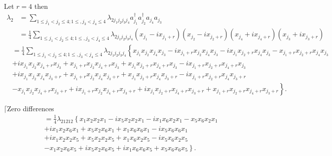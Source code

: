 \documentclass[aps, preprint]{revtex4}
\begin{document}
Let $r =4$ then
\begin{align*}\lambda _{2} &  =\sum _{1 \leq j_{1} <j_{2} \leq 4 ;1 \leq  ,j_{3} <j_{4} \leq 4}\lambda _{2 j_{1} j_{2} j_{3} j_{4}} a_{j_{1}}^{ \dag } a_{j_{2}}^{ \dag } a_{j_{4}} a_{j_{3}} \\
 &  =\frac{1}{4} \sum _{1 \leq j_{1} <j_{2} \leq 4 ;1 \leq  ,j_{3} <j_{4} \leq 4}\lambda _{2 j_{1} j_{2} j_{3} j_{4}} \left (x_{j_{1}} -i x_{j_{1} +r}\right ) \left (x_{j_{2}} -i x_{j_{2} +r}\right ) \left (x_{j_{4}} +i x_{j_{4} +r}\right ) \left (x_{j_{3}} +i x_{j_{3} +r}\right )\end{align*}
\begin{align} &  =\frac{1}{4} \sum _{1 \leq j_{1} <j_{2} \leq 4 ;1 \leq  ,j_{3} <j_{4} \leq 4}\lambda _{2 j_{1} j_{2} j_{3} j_{4}}\left \{x_{j_{1}} x_{j_{2}} x_{j_{4}} x_{j_{3}} -i x_{j_{1} +r} x_{j_{2}} x_{j_{4}} x_{j_{3}} -i x_{j_{1}} x_{j_{2} +r} x_{j_{4}} x_{j_{3}} -x_{j_{1} +r} x_{j_{2} +r} x_{j_{4}} x_{j_{3}}\right . \nonumber  \\
 &  +i x_{j_{1}} x_{j_{2}} x_{j_{4} +r} x_{j_{3}} +x_{j_{1} +r} x_{j_{2}} x_{j_{4} +r} x_{j_{3}} +x_{j_{1}} x_{j_{2} +r} x_{j_{4} +r} x_{j_{3}} -i x_{j_{1} +r} x_{j_{2} +r} x_{j_{4} +r} x_{j_{3}} \nonumber  \\
 &  +i x_{j_{1}} x_{j_{2}} x_{j_{4}} x_{j_{3} +r} +x_{j_{1} +r} x_{j_{2}} x_{j_{4}} x_{j_{3} +r} +x_{j_{1}} x_{j_{2} +r} x_{j_{4}} x_{j_{3} +r} -i x_{j_{1} +r} x_{j_{2} +r} x_{j_{4}} x_{j_{3} +r} \nonumber  \\
 & \left . -x_{j_{1}} x_{j_{2}} x_{j_{4} +r} x_{j_{3} +r} +i x_{j_{1} +r} x_{j_{2}} x_{j_{4} +r} x_{j_{3} +r} +i x_{j_{1}} x_{j_{2} +r} x_{j_{4} +r} x_{j_{3} +r} +x_{j_{1} +r} x_{j_{2} +r} x_{j_{4} +r} x_{j_{3} +r}\right \}\text{.}\end{align}

\bigskip $\lceil $Zero differences
\begin{align} &  =\frac{1}{4} \lambda _{2 1 2 1 2}\left \{x_{1} x_{2} x_{2} x_{1} -i x_{5} x_{2} x_{2} x_{1} -i x_{1} x_{6} x_{2} x_{1} -x_{5} x_{6} x_{2} x_{1}\right . \nonumber  \\
 &  +i x_{1} x_{2} x_{6} x_{1} +x_{5} x_{2} x_{6} x_{1} +x_{1} x_{6} x_{6} x_{1} -i x_{5} x_{6} x_{6} x_{1} \nonumber  \\
 &  +i x_{1} x_{2} x_{2} x_{5} +x_{5} x_{2} x_{2} x_{5} +x_{1} x_{6} x_{2} x_{5} -i x_{5} x_{6} x_{2} x_{5} \nonumber  \\
 & \left . -x_{1} x_{2} x_{6} x_{5} +i x_{5} x_{2} x_{6} x_{5} +i x_{1} x_{6} x_{6} x_{5} +x_{5} x_{6} x_{6} x_{5}\right \}\text{.}\end{align}
\end{document}
